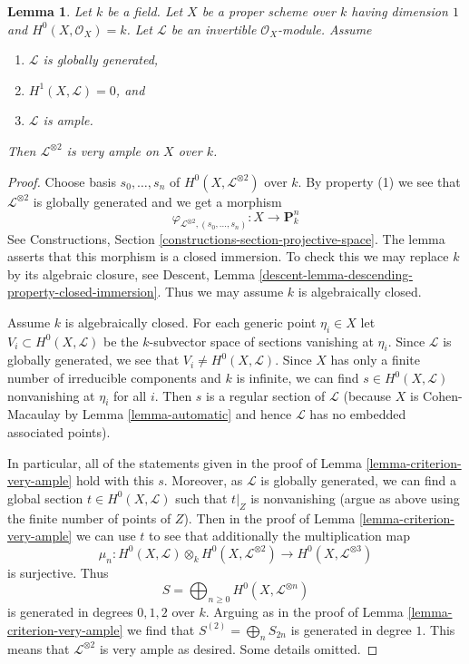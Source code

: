 \documentclass{stacks-project}
\theoremstyle{plain}
\newtheorem{lemma}[subsection]{Lemma}
\theoremstyle{definition}
\theoremstyle{remark}
\numberwithin{equation}{subsection}
\begin{document}
\begin{lemma}
\label{lemma-criterion-very-ample-bis}
Let $k$ be a field. Let $X$ be a proper scheme over $k$ having dimension $1$
and $H^0(X, \mathcal{O}_X) = k$. Let $\mathcal{L}$ be an invertible
$\mathcal{O}_X$-module. Assume
\begin{enumerate}
\item $\mathcal{L}$ is globally generated,
\item $H^1(X, \mathcal{L}) = 0$, and
\item $\mathcal{L}$ is ample.
\end{enumerate}
Then $\mathcal{L}^{\otimes 2}$ is very ample on $X$ over $k$.
\end{lemma}

\begin{proof}
Choose basis $s_0, \ldots, s_n$ of $H^0(X, \mathcal{L}^{\otimes 2})$
over $k$. By property (1) we see that $\mathcal{L}^{\otimes 2}$
is globally generated and we get a morphism
$$
\varphi_{\mathcal{L}^{\otimes 2}, (s_0, \ldots, s_n)} :
X \longrightarrow \mathbf{P}^n_k
$$
See Constructions, Section \ref{constructions-section-projective-space}.
The lemma asserts that this morphism is a closed immersion.
To check this we may replace $k$ by its algebraic closure, see
Descent, Lemma \ref{descent-lemma-descending-property-closed-immersion}.
Thus we may assume $k$ is algebraically closed.

\medskip\noindent
Assume $k$ is algebraically closed. For each generic point $\eta_i \in X$
let $V_i \subset H^0(X, \mathcal{L})$ be the $k$-subvector space of
sections vanishing at $\eta_i$. Since $\mathcal{L}$ is globally generated,
we see that $V_i \not = H^0(X, \mathcal{L})$. Since $X$ has only a
finite number of irreducible components and $k$ is infinite, we can find
$s \in H^0(X, \mathcal{L})$ nonvanishing at $\eta_i$ for all $i$.
Then $s$ is a regular section of $\mathcal{L}$ (because $X$ is
Cohen-Macaulay by Lemma \ref{lemma-automatic} and hence $\mathcal{L}$
has no embedded associated points).

\medskip\noindent
In particular, all of the statements given in the proof of
Lemma \ref{lemma-criterion-very-ample} hold with this $s$.
Moreover, as $\mathcal{L}$ is globally generated, we can find
a global section $t \in H^0(X, \mathcal{L})$ such that
$t|_Z$ is nonvanishing (argue as above using the finite number
of points of $Z$). Then in the proof of Lemma \ref{lemma-criterion-very-ample}
we can use $t$ to see that additionally the multiplication map
$$
\mu_n :
H^0(X, \mathcal{L}) \otimes_k H^0(X, \mathcal{L}^{\otimes 2})
\longrightarrow
H^0(X, \mathcal{L}^{\otimes 3})
$$
is surjective. Thus
$$
S = \bigoplus\nolimits_{n \geq 0} H^0(X, \mathcal{L}^{\otimes n})
$$
is generated in degrees $0, 1, 2$ over $k$. Arguing as in the
proof of Lemma \ref{lemma-criterion-very-ample} we find that
$S^{(2)} = \bigoplus_{n} S_{2n}$ is generated in degree $1$.
This means that $\mathcal{L}^{\otimes 2}$ is very ample as desired.
Some details omitted.
\end{proof}
\end{document}
